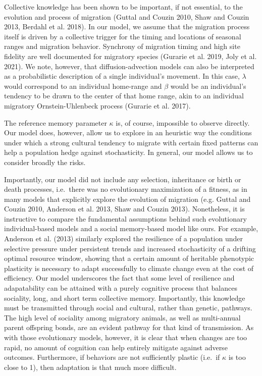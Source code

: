 \documentclass[12pt]{article}
\begin{document}
Collective knowledge has been shown to be important, if not essential,
to the evolution and process of migration (Guttal and Couzin 2010, Shaw
and Couzin 2013, Berdahl et al. 2018). In our model, we assume that the
migration process itself is driven by a collective trigger for the
timing and locations of seasonal ranges and migration behavior.
Synchrony of migration timing and high site fidelity are well documented
for migratory species (Gurarie et al. 2019, Joly et al. 2021). We note,
however, that diffusion-advection models can also be interpreted as a
probabilistic description of a single individual's movement. In this
case, \(\lambda\) would correspond to an individual home-range and
\(\beta\) would be an individual's tendency to be drawn to the center of
that home range, akin to an individual migratory Ornstein-Uhlenbeck
process (Gurarie et al. 2017).

The reference memory parameter \(\kappa\) is, of course, impossible to
observe directly. Our model does, however, allow us to explore in an
heuristic way the conditions under which a strong cultural tendency to
migrate with certain fixed patterns can help a population hedge against
stochasticity. In general, our model allows us to consider broadly the
risks.

Importantly, our model did not include any selection, inheritance or
birth or death processes, i.e.~there was no evolutionary maximization of
a fitness, as in many models that explicitly explore the evolution of
migration (e.g. Guttal and Couzin 2010, Anderson et al. 2013, Shaw and
Couzin 2013). Nonetheless, it is instructive to compare the fundamental
assumptions behind such evolutionary individual-based models and a
social memory-based model like ours. For example, Anderson et al. (2013)
similarly explored the resilience of a population under selective
pressure under persistent trends and increased stochasticity of a
drifting optimal resource window, showing that a certain amount of
heritable phenotypic plasticity is necessary to adapt successfully to
climate change even at the cost of efficiency. Our model underscores the
fact that some level of resilience and adapatability can be attained
with a purely cognitive process that balances sociality, long, and short
term collective memory. Importantly, this knowledge must be transmitted
through social and cultural, rather than genetic, pathways. The high
level of sociality among migratory animals, as well as multi-annual
parent offspring bonds, are an evident pathway for that kind of
transmission. As with those evolutionary models, however, it is clear
that when changes are too rapid, no amount of cognition can help
entirely mitigate against adverse outcomes. Furthermore, if behaviors
are not sufficiently plastic (i.e.~if \(\kappa\) is too close to 1),
then adaptation is that much more difficult.
\end{document}
